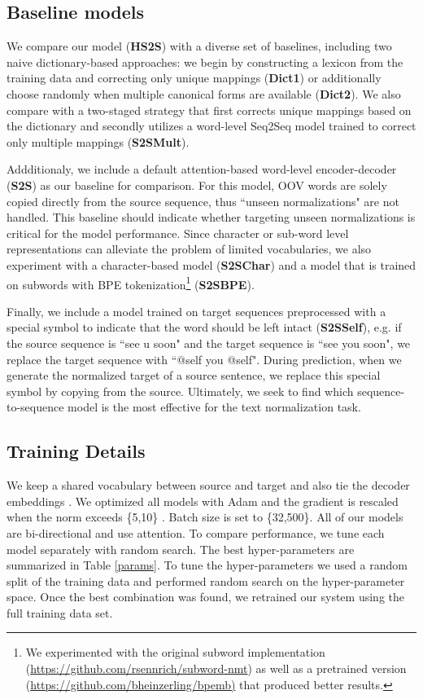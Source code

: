 \documentclass[letterpaper]{article} \usepackage{aaai19}  \usepackage{times}  \usepackage{helvet} \usepackage{courier}  \usepackage[hyphens]{url}  \usepackage{graphicx} \urlstyle{rm} \def\UrlFont{\rm}  \usepackage{graphicx}  \frenchspacing  \setlength{\pdfpagewidth}{8.5in}  \setlength{\pdfpageheight}{11in}
\newcommand{\citep}{\cite}
\begin{document}
\subsection{Baseline models}\label{baselines}
We compare our model (\textbf{HS2S})  with a diverse set of baselines, including two naive dictionary-based approaches: we begin by constructing a lexicon from the training data and correcting only unique mappings (\textbf{Dict1}) or additionally choose randomly when multiple canonical forms are available (\textbf{Dict2}). We also compare with a two-staged strategy that first corrects unique mappings based on the dictionary and secondly utilizes a word-level Seq2Seq model trained to correct only multiple mappings (\textbf{S2SMult}). 

Addditionaly, we include a default attention-based word-level encoder-decoder (\textbf{S2S}) as our baseline for comparison. For this model, OOV words are solely copied directly from the source sequence, thus ``unseen normalizations" are not handled. This baseline should indicate whether targeting unseen normalizations is critical for the model performance. Since character or sub-word level representations can alleviate the problem of limited vocabularies, we also experiment with a character-based model  (\textbf{S2SChar}) and a model that is trained on subwords with BPE tokenization\footnote{We experimented with the original subword implementation (\url{https://github.com/rsennrich/subword-nmt}) as well as a pretrained version \cite{heinzerling2018bpemb} (\url{https://github.com/bheinzerling/bpemb)} that produced better results.} (\textbf{S2SBPE}). 

Finally, we include a model trained on target sequences preprocessed with a special symbol to indicate that the word should be left intact (\textbf{S2SSelf}), e.g. if the source sequence is ``see u soon" and the target sequence is ``see you soon", we replace the target sequence with ``@self you @self".
During prediction, when we generate the normalized target of a source sentence, we replace this special symbol by copying from the source. Ultimately, we seek to find which sequence-to-sequence model is the most effective for the text normalization task.

\subsection{Training Details} 
We keep a shared vocabulary between source and target and also tie the decoder embeddings \citep{press2017using}. We optimized all models with Adam \citep{kingma2014adam} and the gradient is rescaled when the norm exceeds \{5,10\} \citep{pascanu2013difficulty}. Batch size is set to \{32,500\}. All of our models are bi-directional and use attention. To compare performance, we tune each model separately with random search. The best hyper-parameters are summarized in Table \ref{params}. To tune the hyper-parameters we used a  random split of the training data and performed random search on the hyper-parameter space. Once the best combination was found, we retrained our system using the full training data set. 
\end{document}
